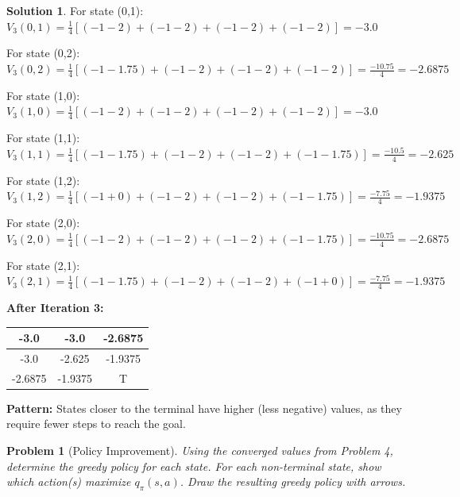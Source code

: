 \documentclass[11pt]{article}
\newtheorem{problem}{Problem}
\theoremstyle{definition}
\newtheorem*{solution}{Solution}
\begin{document}
\begin{solution}
For state (0,1):
$V_3(0,1) = \frac{1}{4}[(-1 - 2) + (-1 - 2) + (-1 - 2) + (-1 - 2)] = -3.0$

For state (0,2):
$V_3(0,2) = \frac{1}{4}[(-1 - 1.75) + (-1 - 2) + (-1 - 2) + (-1 - 2)] = \frac{-10.75}{4} = -2.6875$

For state (1,0):
$V_3(1,0) = \frac{1}{4}[(-1 - 2) + (-1 - 2) + (-1 - 2) + (-1 - 2)] = -3.0$

For state (1,1):
$V_3(1,1) = \frac{1}{4}[(-1 - 1.75) + (-1 - 2) + (-1 - 2) + (-1 - 1.75)] = \frac{-10.5}{4} = -2.625$

For state (1,2):
$V_3(1,2) = \frac{1}{4}[(-1 + 0) + (-1 - 2) + (-1 - 2) + (-1 - 1.75)] = \frac{-7.75}{4} = -1.9375$

For state (2,0):
$V_3(2,0) = \frac{1}{4}[(-1 - 2) + (-1 - 2) + (-1 - 2) + (-1 - 1.75)] = \frac{-10.75}{4} = -2.6875$

For state (2,1):
$V_3(2,1) = \frac{1}{4}[(-1 - 1.75) + (-1 - 2) + (-1 - 2) + (-1 + 0)] = \frac{-7.75}{4} = -1.9375$

\begin{center}
\textbf{After Iteration 3:}
\begin{tabular}{|c|c|c|}
\hline
-3.0 & -3.0 & -2.6875 \\
\hline
-3.0 & -2.625 & -1.9375 \\
\hline
-2.6875 & -1.9375 & T \\
\hline
\end{tabular}
\end{center}

\textbf{Pattern:} States closer to the terminal have higher (less negative) values, as they require fewer steps to reach the goal.
\end{solution}

\newpage

\begin{problem}[Policy Improvement]
Using the converged values from Problem 4, determine the greedy policy for each state. For each non-terminal state, show which action(s) maximize $q_\pi(s,a)$. Draw the resulting greedy policy with arrows.
\end{problem}
\end{document}

